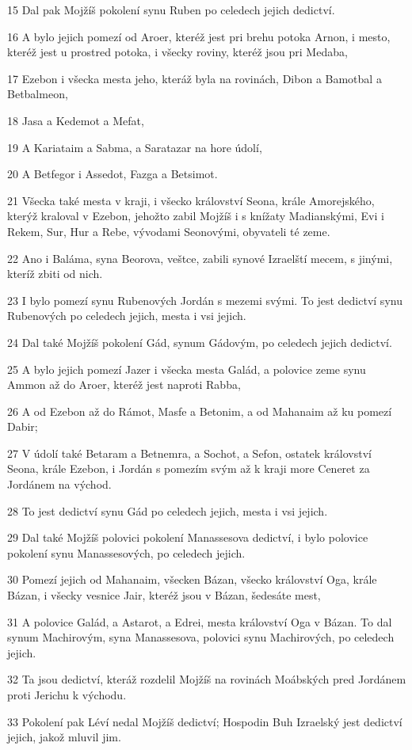 \par 15 Dal pak Mojžíš pokolení synu Ruben po celedech jejich dedictví.
\par 16 A bylo jejich pomezí od Aroer, kteréž jest pri brehu potoka Arnon, i mesto, kteréž jest u prostred potoka, i všecky roviny, kteréž jsou pri Medaba,
\par 17 Ezebon i všecka mesta jeho, kteráž byla na rovinách, Dibon a Bamotbal a Betbalmeon,
\par 18 Jasa a Kedemot a Mefat,
\par 19 A Kariataim a Sabma, a Saratazar na hore údolí,
\par 20 A Betfegor i Assedot, Fazga a Betsimot.
\par 21 Všecka také mesta v kraji, i všecko království Seona, krále Amorejského, kterýž kraloval v Ezebon, jehožto zabil Mojžíš i s knížaty Madianskými, Evi i Rekem, Sur, Hur a Rebe, vývodami Seonovými, obyvateli té zeme.
\par 22 Ano i Baláma, syna Beorova, veštce, zabili synové Izraelští mecem, s jinými, kteríž zbiti od nich.
\par 23 I bylo pomezí synu Rubenových Jordán s mezemi svými. To jest dedictví synu Rubenových po celedech jejich, mesta i vsi jejich.
\par 24 Dal také Mojžíš pokolení Gád, synum Gádovým, po celedech jejich dedictví.
\par 25 A bylo jejich pomezí Jazer i všecka mesta Galád, a polovice zeme synu Ammon až do Aroer, kteréž jest naproti Rabba,
\par 26 A od Ezebon až do Rámot, Masfe a Betonim, a od Mahanaim až ku pomezí Dabir;
\par 27 V údolí také Betaram a Betnemra, a Sochot, a Sefon, ostatek království Seona, krále Ezebon, i Jordán s pomezím svým až k kraji more Ceneret za Jordánem na východ.
\par 28 To jest dedictví synu Gád po celedech jejich, mesta i vsi jejich.
\par 29 Dal také Mojžíš polovici pokolení Manassesova dedictví, i bylo polovice pokolení synu Manassesových, po celedech jejich.
\par 30 Pomezí jejich od Mahanaim, všecken Bázan, všecko království Oga, krále Bázan, i všecky vesnice Jair, kteréž jsou v Bázan, šedesáte mest,
\par 31 A polovice Galád, a Astarot, a Edrei, mesta království Oga v Bázan. To dal synum Machirovým, syna Manassesova, polovici synu Machirových, po celedech jejich.
\par 32 Ta jsou dedictví, kteráž rozdelil Mojžíš na rovinách Moábských pred Jordánem proti Jerichu k východu.
\par 33 Pokolení pak Léví nedal Mojžíš dedictví; Hospodin Buh Izraelský jest dedictví jejich, jakož mluvil jim.

